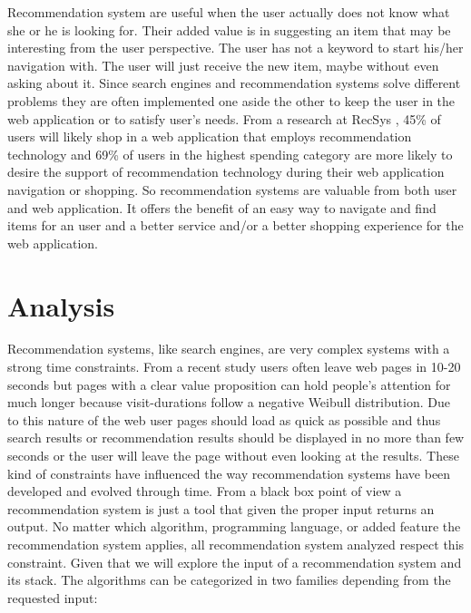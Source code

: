 Recommendation system are useful when the user actually does not know what she or he is looking for. Their added value is in suggesting an item that may be interesting from the user perspective. The user has not a keyword to start his/her navigation with. The user will just receive the new item, maybe without even asking about it. Since search engines and recommendation systems solve different problems they are often implemented one aside the other to keep the user in the web application or to satisfy user's needs. From a research \cite{usercentric_evaluation_framework} at RecSys \cite{recsys}, 45\% of users will likely shop in a web application that employs recommendation technology and 69\% of users in the highest spending category are more likely to desire the support of recommendation technology during their web application navigation or shopping. So recommendation systems are valuable from both user and web application. It offers the benefit of an easy way to navigate and find items for an user and a better service and/or a better shopping experience for the web application.

\section{Analysis}
\label{sec:Analysis}

Recommendation systems, like search engines, are very complex systems with a strong time constraints. From a recent study \cite{page-abandonment} users often leave web pages in 10-20 seconds but pages with a clear value proposition can hold people's attention for much longer because visit-durations follow a negative Weibull distribution. Due to this nature of the web user pages should load as quick as possible and thus search results or recommendation results should be displayed in no more than few seconds or the user will leave the page without even looking at the results. These kind of constraints have influenced the way recommendation systems have been developed and evolved through time.
From a black box point of view a recommendation system is just a tool that given the proper input returns an output. No matter which algorithm, programming language, or added feature the recommendation system applies, all recommendation system analyzed respect this constraint. Given that we will explore the input of a recommendation system and its stack. The algorithms can be categorized in two families depending from the requested input:

